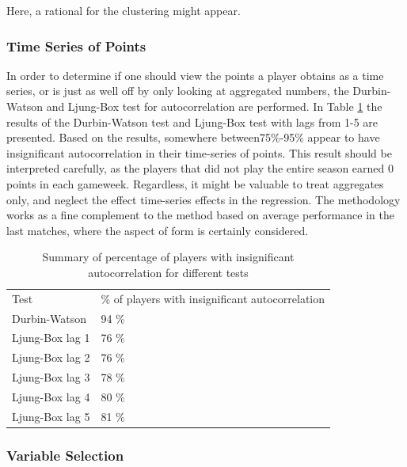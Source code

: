 Here, a rational for the clustering might appear.

\subsubsection{Time Series of Points}

In order to determine if one should view the points a player obtains as a time series, or is just as well off by only looking at aggregated numbers, the Durbin-Watson and Ljung-Box test for autocorrelation are performed. In Table \ref{tab:auto_tests} the results of the Durbin-Watson test and Ljung-Box test with lags from 1-5 are presented. Based on the results, somewhere between75\%-95\% appear to have insignificant autocorrelation in their time-series of points. This result should be interpreted carefully, as the players that did not play the entire season earned 0 points in each gameweek. Regardless, it might be valuable to treat aggregates only, and neglect the effect time-series effects in the regression. The methodology works as a fine complement to the method based on average performance in the last matches, where the aspect of form is certainly considered.

\begin{table}[H]
\centering
\caption{Summary of percentage of players with insignificant autocorrelation for different tests}
\label{tab:auto_tests}
\begin{tabular}{ll}
Test            & \% of players with insignificant autocorrelation \\
Durbin-Watson   & 94 \%                                            \\
Ljung-Box lag 1 & 76 \%                                            \\
Ljung-Box lag 2 & 76 \%                                            \\
Ljung-Box lag 3 & 78 \%                                            \\
Ljung-Box lag 4 & 80 \%                                            \\
Ljung-Box lag 5 & 81 \%                                           
\end{tabular}
\end{table}

\subsubsection{Variable Selection}

